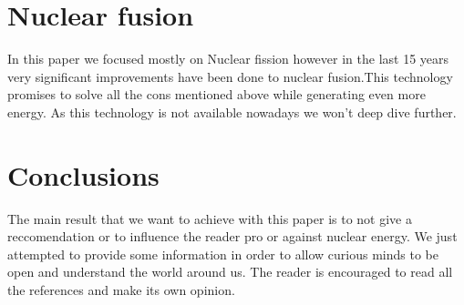 \documentclass{article}
\begin{document}
\section{Nuclear fusion}
In this paper we focused mostly on Nuclear fission however in the last 15 years very significant improvements have been done to nuclear fusion.This technology promises to solve all the cons mentioned above while generating even more energy. As this technology is not available nowadays we won't deep dive further.

\section{Conclusions}

The main result that we want to achieve with this paper is to not give a reccomendation or to influence the reader pro or against nuclear energy. We just attempted to provide some information in order to allow curious minds to be open and understand the world around us. The reader is encouraged to read all the references and make its own opinion.
\end{document}
